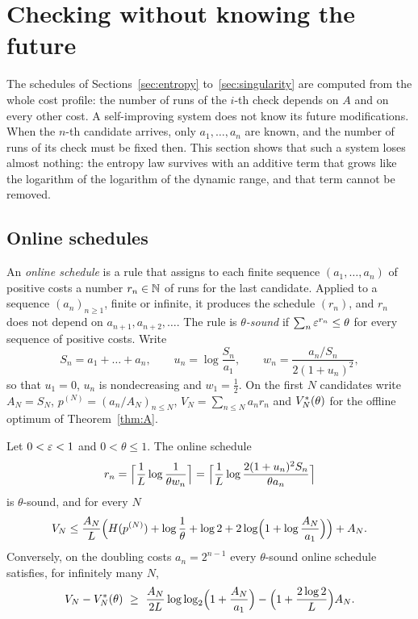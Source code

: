 \section{Checking without knowing the future}\label{sec:online}

The schedules of Sections~\ref{sec:entropy} to~\ref{sec:singularity} are computed from the whole cost profile: the number of runs of the $i$-th check depends on $A$ and on every other cost. A self-improving system does not know its future modifications. When the $n$-th candidate arrives, only $a_{1},\dots,a_{n}$ are known, and the number of runs of its check must be fixed then. This section shows that such a system loses almost nothing: the entropy law survives with an additive term that grows like the logarithm of the logarithm of the dynamic range, and that term cannot be removed.

\subsection{Online schedules}

An \emph{online schedule} is a rule that assigns to each finite sequence $(a_{1},\dots,a_{n})$ of positive costs a number $r_{n}\in\mathbb{N}$ of runs for the last candidate. Applied to a sequence $(a_{n})_{n\ge1}$, finite or infinite, it produces the schedule $(r_{n})$, and $r_{n}$ does not depend on $a_{n+1},a_{n+2},\dots$. The rule is \emph{$\theta$-sound} if $\sum_{n}\varepsilon^{r_{n}}\le\theta$ for every sequence of positive costs. Write
\[
S_{n}=a_{1}+\dots+a_{n},\qquad u_{n}=\log\frac{S_{n}}{a_{1}},\qquad w_{n}=\frac{a_{n}/S_{n}}{2(1+u_{n})^{2}},
\]
so that $u_{1}=0$, $u_{n}$ is nondecreasing and $w_{1}=\frac12$. On the first $N$ candidates write $A_{N}=S_{N}$, $p^{(N)}=(a_{n}/A_{N})_{n\le N}$, $V_{N}=\sum_{n\le N}a_{n}r_{n}$ and $V^{*}_{N}(\theta)$ for the offline optimum of Theorem~\ref{thm:A}.

\begin{mainthm}\label{thm:G}
Let $0<\varepsilon<1$ and $0<\theta\le1$. The online schedule
\begin{equation}\label{eq:onlinerule}
r_{n}=\Bigl\lceil\frac1L\log\frac{1}{\theta w_{n}}\Bigr\rceil=\Bigl\lceil\frac1L\log\frac{2(1+u_{n})^{2}S_{n}}{\theta a_{n}}\Bigr\rceil
\end{equation}
is $\theta$-sound, and for every $N$
\begin{equation}\label{eq:onlineupper}
V_{N}\le\frac{A_{N}}{L}\Bigl(H(p^{(N)})+\log\frac1\theta+\log2+2\log\Bigl(1+\log\frac{A_{N}}{a_{1}}\Bigr)\Bigr)+A_{N}.
\end{equation}
Conversely, on the doubling costs $a_{n}=2^{n-1}$ every $\theta$-sound online schedule satisfies, for infinitely many $N$,
\begin{equation}\label{eq:onlinelower}
V_{N}-\Vs_{N}(\theta)\ \ge\ \frac{A_{N}}{2L}\log\log_{2}\Bigl(1+\frac{A_{N}}{a_{1}}\Bigr)-\Bigl(1+\frac{2\log2}{L}\Bigr)A_{N}.
\end{equation}
\end{mainthm}

